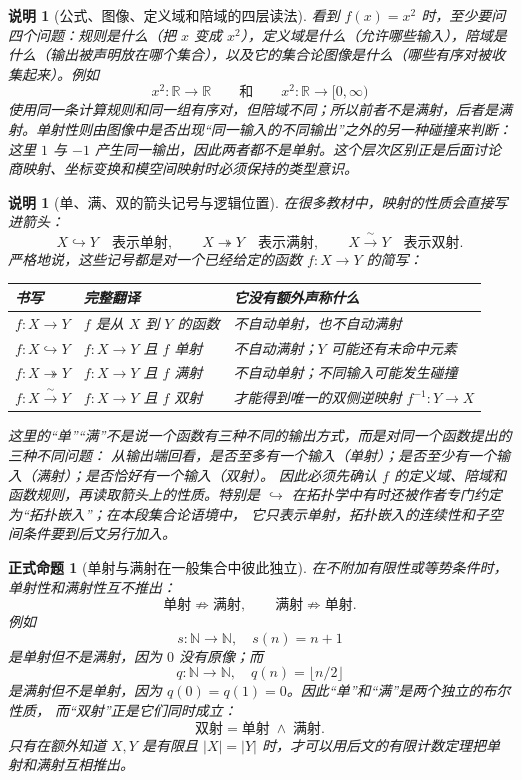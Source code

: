 \documentclass[UTF8,fontset=none,a4paper,11pt]{ctexart}
\theoremstyle{foundation-definition}
\theoremstyle{foundation-theorem}
\theoremstyle{foundation-proposition}
\newtheorem{proposition}[definition]{正式命题}
\theoremstyle{foundation-example}
\theoremstyle{foundation-remark}
\newtheorem{remark}[definition]{说明}
\theoremstyle{foundation-theorem}
\begin{document}
\begin{remark}[公式、图像、定义域和陪域的四层读法]
看到 \(f(x)=x^2\) 时，至少要问四个问题：规则是什么（把 \(x\) 变成 \(x^2\)），定义域是什么（允许哪些输入），陪域是什么（输出被声明放在哪个集合），以及它的集合论图像是什么（哪些有序对被收集起来）。例如
\[
  x^2:\mathbb R\to\mathbb R
  \qquad\text{和}\qquad
  x^2:\mathbb R\to[0,\infty)
\]
使用同一条计算规则和同一组有序对，但陪域不同；所以前者不是满射，后者是满射。单射性则由图像中是否出现“同一输入的不同输出”之外的另一种碰撞来判断：这里 \(1\) 与 \(-1\) 产生同一输出，因此两者都不是单射。这个层次区别正是后面讨论商映射、坐标变换和模空间映射时必须保持的类型意识。
\end{remark}

\begin{remark}[单、满、双的箭头记号与逻辑位置]\label{rem:map-arrow-notation}
在很多教材中，映射的性质会直接写进箭头：
\[
  X\mathrel{\hookrightarrow}Y
  \quad\text{表示单射},\qquad
  X\mathrel{\twoheadrightarrow}Y
  \quad\text{表示满射},\qquad
  X\xrightarrow{\ \sim\ }Y
  \quad\text{表示双射}.
\]
严格地说，这些记号都是对一个已经给定的函数 $f:X\to Y$ 的简写：
\begin{center}
\begin{tabularx}{\textwidth}{p{}p{}X}
\toprule
书写 & 完整翻译 & 它没有额外声称什么 \\
\midrule
$f:X\to Y$ & $f$ 是从 $X$ 到 $Y$ 的函数 & 不自动单射，也不自动满射 \\
$f:X\hookrightarrow Y$ & $f:X\to Y$ 且 $f$ 单射 & 不自动满射；$Y$ 可能还有未命中元素 \\
$f:X\twoheadrightarrow Y$ & $f:X\to Y$ 且 $f$ 满射 & 不自动单射；不同输入可能发生碰撞 \\
$f:X\xrightarrow{\ \sim\ }Y$ & $f:X\to Y$ 且 $f$ 双射 & 才能得到唯一的双侧逆映射 $f^{-1}:Y\to X$ \\
\bottomrule
\end{tabularx}
\end{center}
这里的“单”“满”不是说一个函数有三种不同的输出方式，而是对同一个函数提出的三种不同问题：
从输出端回看，是否至多有一个输入（单射）；是否至少有一个输入（满射）；是否恰好有一个输入（双射）。
因此必须先确认 $f$ 的定义域、陪域和函数规则，再读取箭头上的性质。特别是
\(\hookrightarrow\) 在拓扑学中有时还被作者专门约定为“拓扑嵌入”；在本段集合论语境中，
它只表示单射，拓扑嵌入的连续性和子空间条件要到后文另行加入。
\end{remark}

\begin{proposition}[单射与满射在一般集合中彼此独立]\label{prop:single-surj-independent}
在不附加有限性或等势条件时，单射性和满射性互不推出：
\[
\text{单射}\not\Longrightarrow\text{满射},\qquad
\text{满射}\not\Longrightarrow\text{单射}.
\]
例如
\[
  s:\mathbb N\to\mathbb N,\quad s(n)=n+1
\]
是单射但不是满射，因为 $0$ 没有原像；而
\[
  q:\mathbb N\to\mathbb N,\quad q(n)=\lfloor n/2\rfloor
\]
是满射但不是单射，因为 $q(0)=q(1)=0$。因此“单”和“满”是两个独立的布尔性质，
而“双射”正是它们同时成立：
\[
  \text{双射}=\text{单射}\;\land\;\text{满射}.
\]
只有在额外知道 $X,Y$ 是有限且 $|X|=|Y|$ 时，才可以用后文的有限计数定理把单射和满射互相推出。
\end{proposition}
\end{document}
